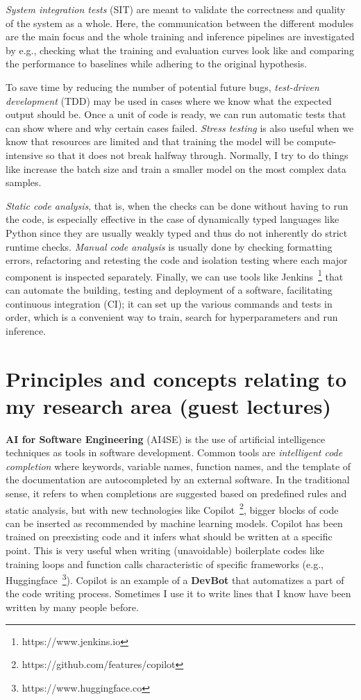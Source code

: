 \documentclass[11pt]{article}
\begin{document}
\textit{System integration tests} (SIT) are meant to validate the correctness and quality of the system as a whole. Here, the communication between the different modules are the main focus and the whole training and inference pipelines are investigated by e.g., checking what the training and evaluation curves look like and comparing the performance to baselines while adhering to the original hypothesis.

To save time by reducing the number of potential future bugs, \textit{test-driven development} (TDD) may be used in cases where we know what the expected output should be. Once a unit of code is ready, we can run automatic tests that can show where and why certain cases failed. \textit{Stress testing} is also useful when we know that resources are limited and that training the model will be compute-intensive so that it does not break halfway through. Normally, I try to do things like increase the batch size and train a smaller model on the most complex data samples.

\textit{Static code analysis}, that is, when the checks can be done without having to run the code, is especially effective in the case of dynamically typed languages like Python since they are usually weakly typed and thus do not inherently do strict runtime checks. \textit{Manual code analysis} is usually done by checking formatting errors, refactoring and retesting the code and isolation testing where each major component is inspected separately. Finally, we can use tools like Jenkins~\footnote{https://www.jenkins.io} that can automate the building, testing and deployment of a software, facilitating continuous integration (CI); it can set up the various commands and tests in order, which is a convenient way to train, search for hyperparameters and run inference.

\section{Principles and concepts relating to my research area (guest lectures)} 

\textbf{AI for Software Engineering} (AI4SE) is the use of artificial intelligence techniques as tools in software development. Common tools are \textit{intelligent code completion} where keywords, variable names, function names, and the template of the documentation are autocompleted by an external software. In the traditional sense, it refers to when completions are suggested based on predefined rules and static analysis, but with new technologies like Copilot~\footnote{https://github.com/features/copilot}, bigger blocks of code can be inserted as recommended by machine learning models. Copilot has been trained on preexisting code and it infers what should be written at a specific point. This is very useful when writing (unavoidable) boilerplate codes like training loops and function calls characteristic of specific frameworks (e.g., Huggingface~\footnote{https://www.huggingface.co}). Copilot is an example of a \textbf{DevBot} that automatizes a part of the code writing process. Sometimes I use it to write lines that I know have been written by many people before.
\end{document}
